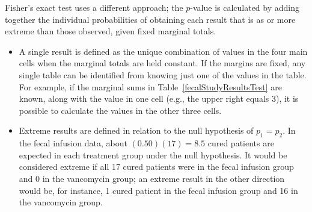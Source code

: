 Fisher's exact test uses a different approach; the $p$-value is calculated by adding together the individual probabilities of obtaining each result that is as or more extreme than those observed, given fixed marginal totals. 

\begin{itemize}
	\item A single result is defined as the unique combination of values in the four main cells when the marginal totals are held constant. If the margins are fixed, any single table can be identified from knowing just one of the values in the table. For example, if the marginal sums in Table~\ref{fecalStudyResultsTest} are known, along with the value in one cell (e.g., the upper right equals 3), it is possible to calculate the values in the other three cells. 
	
	\item Extreme results are defined in relation to the null hypothesis of $p_1 = p_2$. In the fecal infusion data, about $(0.50)(17) = 8.5$ cured patients are expected in each treatment group under the null hypothesis. It would be considered extreme if all 17 cured patients were in the fecal infusion group and 0 in the vancomycin group; an extreme result in the other direction would be, for instance, 1 cured patient in the fecal infusion group and 16 in the vancomycin group.
\end{itemize}

\newpage

